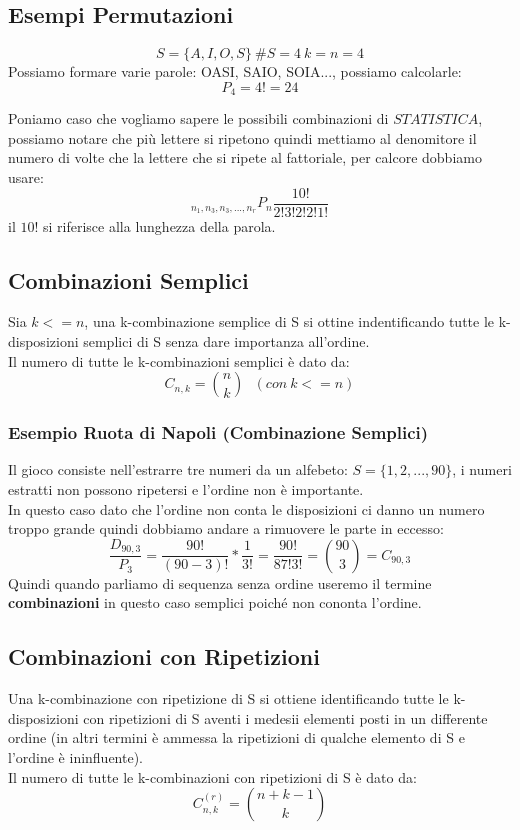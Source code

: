 \subsection{Esempi Permutazioni}
$$ S=\{A,I,O,S\} \: \#S=4 \: k=n=4  $$
Possiamo formare varie parole: OASI, SAIO, SOIA..., possiamo calcolarle:
$$ P_4 = 4! = 24  $$

Poniamo caso che vogliamo sapere le possibili combinazioni di $STATISTICA$, possiamo notare che più lettere si ripetono quindi mettiamo al denomitore il numero di volte che la lettere che si ripete al fattoriale, per calcore dobbiamo usare:
$$ _{n_1,n_3,n_3,...,n_r}P_n \frac{10!}{2!3!2!2!1!} $$
il $10!$ si riferisce alla lunghezza della parola.

\subsection{Combinazioni Semplici}
Sia $k<=n$, una k-combinazione semplice di S si ottine indentificando tutte le k-disposizioni semplici di S senza dare importanza all'ordine.\\
Il numero di tutte le k-combinazioni semplici è dato da:
$$ C_{n,k} = \binom{n}{k} \: \: \: (con\:k<=n)$$

\subsubsection{Esempio Ruota di Napoli (Combinazione Semplici)}
Il gioco consiste nell'estrarre tre numeri da un alfebeto: $S=\{1,2,...,90\}$, i numeri estratti non possono ripetersi e l'ordine non è importante.\\
In questo caso dato che l'ordine non conta le disposizioni ci danno un numero troppo grande quindi dobbiamo andare a rimuovere le parte in eccesso:
$$ \frac{D_{90,3}}{P_3} = \frac{90!}{(90-3)!}*\frac{1}{3!} = \frac{90!}{87! 3!} = \binom{90}{3} = C_{90,3} $$
Quindi quando parliamo di sequenza senza ordine useremo il termine \textbf{combinazioni} in questo caso semplici poiché non cononta l'ordine.

\subsection{Combinazioni con Ripetizioni}
Una k-combinazione con ripetizione di S si ottiene identificando tutte le k-disposizioni con ripetizioni di S aventi i medesii elementi posti in un differente ordine (in altri termini è ammessa la ripetizioni di qualche elemento di S e l'ordine è ininfluente).\\
Il numero di tutte le k-combinazioni con ripetizioni di S è dato da:
$$ C_{n,k}^{(r)} = \binom{n+k-1}{k} $$

